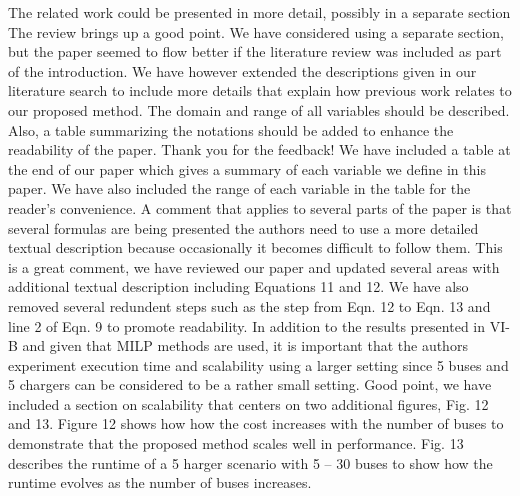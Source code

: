 \documentclass{article}
\begin{document}
\begin{buttkissing}
	\reviewerclaims The related work could be presented in more detail, possibly in a separate section
	\kissbutt The review brings up a good point.  We have considered using a separate section, but the paper seemed to flow better if the literature review was included as part of the introduction. We have however extended the descriptions given in our literature search to include more details that explain how previous work relates to our proposed method.  
	\reviewerclaims The domain and range of all variables should be described. Also, a table summarizing the notations should be added to enhance the readability of the paper.
	\kissbutt Thank you for the feedback! We have included a table at the end of our paper which gives a summary of each variable we define in this paper.  We have also included the range of each variable in the table for the reader's convenience.  
	\reviewerclaims A comment that applies to several parts of the paper is that several formulas are being presented the authors need to use a more detailed textual description because occasionally it becomes difficult to follow them.
	\kissbutt This is a great comment, we have reviewed our paper and updated several areas with additional textual description including Equations 11 and 12. We have also removed several redundent steps such as the step from Eqn. 12 to Eqn. 13 and line 2 of Eqn. 9 to promote readability.  
	\reviewerclaims In addition to the results presented in VI-B and given that MILP methods are used, it is important that the authors experiment execution time and scalability using a larger setting since 5 buses and 5 chargers can be considered to be a rather small setting.
	\kissbutt Good point, we have included a section on scalability that centers on two additional figures, Fig. 12 and 13. Figure 12 shows how how the cost increases with the number of buses to demonstrate that the proposed method scales well in performance. Fig. 13 describes the runtime of a 5 harger scenario with 5 -- 30 buses to show how the runtime evolves as the number of buses increases.  
\end{buttkissing}
\end{document}
